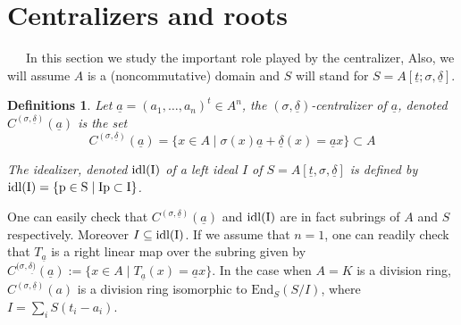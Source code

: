 \documentclass[12pt,a4paper]{article}
\newtheorem{definitions}[theorem]{Definitions}
\newcommand{\de}{\delta}
\newcommand{\si}{\sigma}
\newcommand{\ut}{\underline{t}}
\newcommand{\ua}{\underline{a}}
\newcommand{\ud}{\underline{\delta}}
\begin{document}
	
	\section{Centralizers and roots}
	
	~~~In this section we study the important role played by the centralizer, Also, we will assume $A$ is a (noncommutative) domain and $S$ will stand for $S=A[\ut;\sigma,\ud]$.
	
	
	\begin{definitions}
		Let $\ua=(a_1,\dots,a_n)^t\in A^n$, the $(\sigma,\ud)$-centralizer of $\ua$, denoted $C^{(\sigma,\ud)}(\ua)$ is the set
		\begin{equation} \label{centralizer}
			C^{(\sigma,\ud)}(\ua)=\{x\in A \mid \sigma(x)\ua + \ud(x)=\ua x \} \subset A
		\end{equation}
		
		 
		
		The idealizer, denoted $\rm{idl}(I)$ of a left ideal $I$ of $S=A[\ut,\sigma, \ud]$ is defined by 
		$\rm{idl}(I)=\{p\in S\mid Ip\subset I\}$.
	\end{definitions}
	
	One can easily check that $C^{(\sigma,\ud)}(\ua)$ and $\rm{idl}(I)$ are in fact  subrings of $A$ and $S$ respectively.  Moreover $I\subseteq \rm{idl}(I)$. If we assume that $n=1$, one 
	can readily check that $T_{\ua}$ is a right linear map over the subring 
	given by $C^{(\si, \underline{\de)}}(\ua):=\{x\in A \mid T_{\ua}(x)=\ua x\}$. 
	In the case when $A=K$ is a division ring, $C^{(\si, \underline{\de})}(a)$ 
	is a division ring isomorphic to $\mathrm{End}_S(S/I)$, where $I=\sum_i S(t_i-a_i)$.  
	
\end{document}

